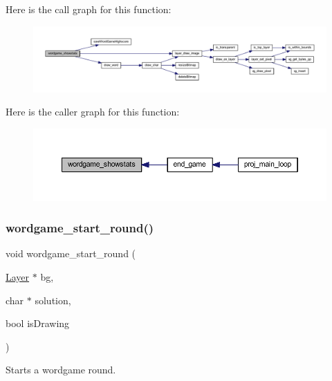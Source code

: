 Here is the call graph for this function\+:\nopagebreak
\begin{figure}[H]
\begin{center}
\leavevmode
\includegraphics[width=350pt]{group__wordpicker_ga88c86e1108700ca4a9a38a276e70e3c9_cgraph}
\end{center}
\end{figure}
Here is the caller graph for this function\+:\nopagebreak
\begin{figure}[H]
\begin{center}
\leavevmode
\includegraphics[width=350pt]{group__wordpicker_ga88c86e1108700ca4a9a38a276e70e3c9_icgraph}
\end{center}
\end{figure}
\mbox{\label{group__wordpicker_gabec56325a776cfd186cc799eb7a8c6b8}} 
\subsubsection{\texorpdfstring{wordgame\+\_\+start\+\_\+round()}{wordgame\_start\_round()}}
{\footnotesize\ttfamily void wordgame\+\_\+start\+\_\+round (\begin{DoxyParamCaption}\item[{\mbox{\hyperlink{struct_layer}{Layer}} $\ast$}]{bg,  }\item[{char $\ast$}]{solution,  }\item[{bool}]{is\+Drawing }\end{DoxyParamCaption})}



Starts a wordgame round. 


